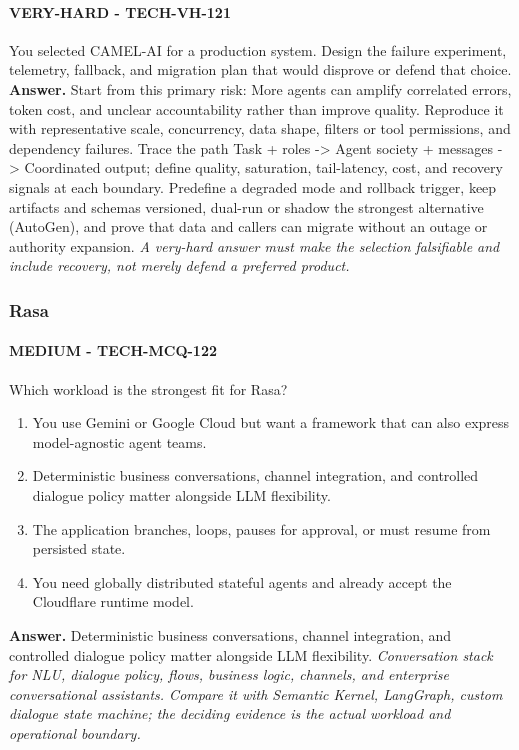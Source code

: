 \paragraph{VERY-HARD - TECH-VH-121} You selected CAMEL-AI for a production system. Design the failure experiment, telemetry, fallback, and migration plan that would disprove or defend that choice.
\textbf{Answer.} Start from this primary risk: More agents can amplify correlated errors, token cost, and unclear accountability rather than improve quality. Reproduce it with representative scale, concurrency, data shape, filters or tool permissions, and dependency failures. Trace the path Task + roles -> Agent society + messages -> Coordinated output; define quality, saturation, tail-latency, cost, and recovery signals at each boundary. Predefine a degraded mode and rollback trigger, keep artifacts and schemas versioned, dual-run or shadow the strongest alternative (AutoGen), and prove that data and callers can migrate without an outage or authority expansion.
\textit{A very-hard answer must make the selection falsifiable and include recovery, not merely defend a preferred product.}
\subsubsection*{Rasa}
\paragraph{MEDIUM - TECH-MCQ-122} Which workload is the strongest fit for Rasa?
\begin{enumerate}[label=\Alph*.]
\item You use Gemini or Google Cloud but want a framework that can also express model-agnostic agent teams.
\item Deterministic business conversations, channel integration, and controlled dialogue policy matter alongside LLM flexibility.
\item The application branches, loops, pauses for approval, or must resume from persisted state.
\item You need globally distributed stateful agents and already accept the Cloudflare runtime model.
\end{enumerate}
\textbf{Answer.} Deterministic business conversations, channel integration, and controlled dialogue policy matter alongside LLM flexibility.
\textit{Conversation stack for NLU, dialogue policy, flows, business logic, channels, and enterprise conversational assistants. Compare it with Semantic Kernel, LangGraph, custom dialogue state machine; the deciding evidence is the actual workload and operational boundary.}
